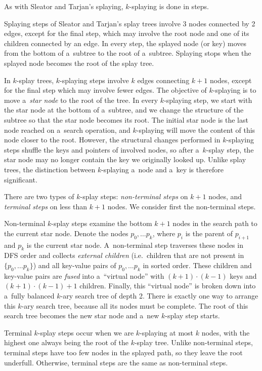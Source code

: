 As with Sleator and Tarjan's splaying, $k$-splaying is done in steps.

Splaying steps of Sleator and Tarjan's splay trees involve 3 nodes connected
by 2 edges, except for the final step, which may involve the root node and one
of its children connected by an edge. In every step, the splayed node (or key)
moves from the bottom of a~subtree to the root of a~subtree.
Splaying stops when the splayed node becomes the root of the splay tree.

In $k$-splay trees, $k$-splaying steps involve $k$ edges connecting
$k+1$ nodes, except for the final step which may involve fewer edges.
The objective of $k$-splaying is to move a~\emph{star node} to the
root of the tree. In every $k$-splaying step, we start with the star node
at the bottom of a~subtree, and we change the structure of the subtree
so that the star node becomes its root.
The initial star node is the last node reached on a~search operation, and
$k$-splaying will move the content of this node closer to the root.
However, the structural changes performed in $k$-splaying steps shuffle
the keys and pointers of involved nodes, so after a~$k$-splay step,
the star node may no longer contain the key we originally looked up.
Unlike splay trees, the distinction between $k$-splaying a~node and a~key
is therefore significant.

There are two types of $k$-splay steps: \emph{non-terminal steps} on
$k+1$ nodes, and \emph{terminal steps} on less than $k+1$ nodes.
We consider first the non-terminal steps.

Non-terminal $k$-splay steps examine the bottom $k+1$ nodes in the search
path to the current star node. Denote the nodes $p_0,\ldots p_{k}$, where $p_i$
is the parent of $p_{i+1}$ and $p_k$ is the current star node. A~non-terminal
step traverses these nodes in DFS order and collects \emph{external children}
(i.e.\ children that are not present in $\{p_0,\ldots p_k\}$) and all key-value
pairs of $p_0,\ldots p_k$ in sorted order. These children and key-value pairs
are \emph{fused} into a~``virtual node'' with $(k+1)\cdot (k-1)$ keys and
$(k+1)\cdot(k-1) + 1$ children. Finally, this ``virtual node'' is broken down
into a~fully balanced $k$-ary search tree of depth 2. There is exactly one
way to arrange this $k$-ary search tree, because all its nodes must be complete.
The root of this search tree becomes the new star node and a~new $k$-splay
step starts.

Terminal $k$-splay steps occur when we are $k$-splaying at most $k$
nodes, with the highest one always being the root of the $k$-splay tree.
Unlike non-terminal steps, terminal steps have too few nodes in the splayed
path, so they leave the root underfull. Otherwise, terminal steps are the same
as non-terminal steps.

